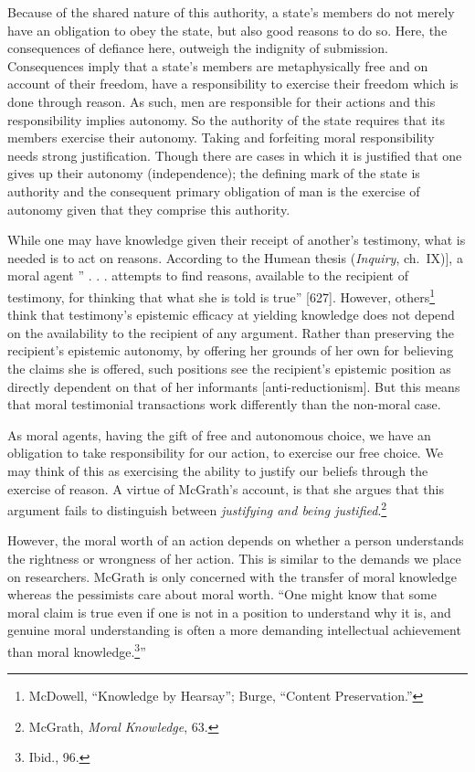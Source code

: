 \documentclass[phdthesis,12pt,final,a4paper]{wuthesis}
\theoremstyle{definition}
\theoremstyle{definition}
\theoremstyle{definition}
\theoremstyle{definition}
\theoremstyle{remark}
\begin{document}
Because of the shared nature of this authority, a state's members do not merely have an obligation to obey the state, but also good reasons to do so. Here, the consequences of defiance here, outweigh the indignity of submission. Consequences imply that a state's members are metaphysically free and on account of their freedom, have a responsibility to exercise their freedom which is done through reason. As such, men are responsible for their actions and this responsibility implies autonomy. So the authority of the state requires that its members exercise their autonomy. Taking and forfeiting moral responsibility needs strong justification. Though there are cases in which it is justified that one gives up their autonomy (independence); the defining mark of the state is authority and the consequent primary obligation of man is the exercise of autonomy given that they comprise this authority.

While one may have knowledge given their receipt of another's testimony, what is needed is to act on reasons. According to the Humean thesis (\emph{Inquiry}, ch.~IX){]}, a moral agent '' . . . attempts to find reasons, available to the recipient of testimony, for thinking that what she is told is true'' {[}627{]}. However, others\footnote{McDowell, {``Knowledge by {Hearsay}''}; Burge, {``Content {Preservation}.''}} think that testimony's epistemic efficacy at yielding knowledge does not depend on the availability to the recipient of any argument. Rather than preserving the recipient's epistemic autonomy, by offering her grounds of her own for believing the claims she is offered, such positions see the recipient's epistemic position as directly dependent on that of her informants {[}anti-reductionism{]}. But this means that moral testimonial transactions work differently than the non-moral case.

As moral agents, having the gift of free and autonomous choice, we have an obligation to take responsibility for our action, to exercise our free choice. We may think of this as exercising the ability to justify our beliefs through the exercise of reason. A virtue of McGrath's account, is that she argues that this argument fails to distinguish between \emph{justifying and being justified}.\footnote{McGrath, \emph{Moral {Knowledge}}, 63.}

However, the moral worth of an action depends on whether a person understands the rightness or wrongness of her action. This is similar to the demands we place on researchers. McGrath is only concerned with the transfer of moral knowledge whereas the pessimists care about moral worth. ``One might know that some moral claim is true even if one is not in a position to understand why it is, and genuine moral understanding is often a more demanding intellectual achievement than moral knowledge.\footnote{Ibid., 96.}''
\end{document}

